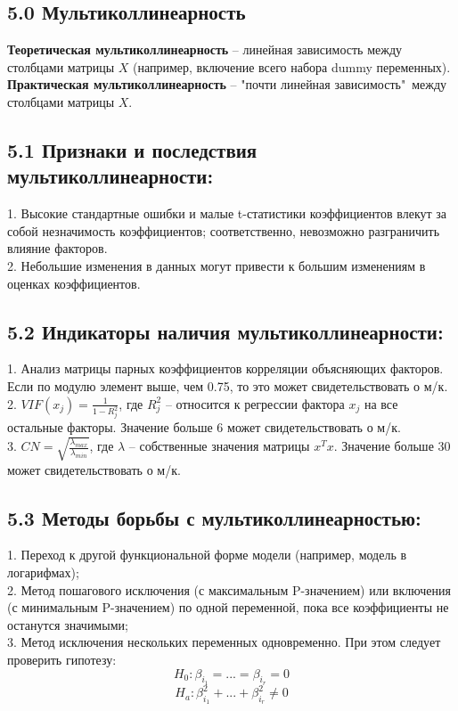\documentclass[a0,final]{a0poster}
\begin{document}
\begin{multicols}{4}
\section*{5.0 Мультиколлинеарность}
\begin{tcolorbox}[colback=purple!5!white,colframe=purple!75!black]
\textbf{Теоретическая мультиколлинеарность} -- линейная зависимость между столбцами матрицы $X$ (например, включение всего набора dummy переменных).\\
\textbf{Практическая мультиколлинеарность} -- "почти линейная зависимость"\ между столбцами матрицы $X$.
\end{tcolorbox}
\subsection*{5.1 Признаки и последствия мультиколлинеарности:}
1. Высокие стандартные ошибки и малые t-статистики коэффициентов влекут за собой незначимость коэффициентов; соответственно, невозможно разграничить влияние факторов. \\
2. Небольшие изменения в данных могут привести к большим изменениям в оценках коэффициентов.
\subsection*{5.2 Индикаторы наличия мультиколлинеарности:}
1. Анализ матрицы парных коэффициентов корреляции объясняющих факторов. Если по модулю элемент выше, чем 0.75, то это может свидетельствовать о м/к. \\
2. $VIF(x_j)= \frac{1}{1-R^2_j}$, где $R^2_j$ -- относится к регрессии фактора $x_j$ на все остальные факторы. Значение больше 6 может свидетельствовать о м/к. \\
3. $CN = \sqrt{\frac{\lambda_{max}}{\lambda_{min}}}$, где $\lambda$ -- собственные значения матрицы $x^Tx$. Значение больше 30 может свидетельствовать о м/к.
\subsection*{5.3 Методы борьбы с мультиколлинеарностью:}
1. Переход к другой функциональной форме модели (например, модель в логарифмах); \\
2. Метод пошагового исключения (с максимальным P-значением) или включения (с минимальным P-значением) по одной переменной, пока все коэффициенты не останутся значимыми; \\
3. Метод исключения нескольких переменных одновременно. При этом следует проверить гипотезу:
\[H_0: \beta_{i_1}=...=\beta_{i_r}=0\]
\[H_a: \beta^2_{i_1}+...+\beta^2_{i_r}\ne0\]
\columnbreak


\end{multicols}
\end{document}
